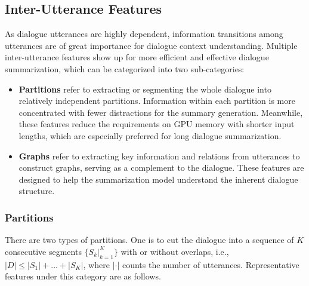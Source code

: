 
\subsection{Inter-Utterance Features}\label{sec:interutt}

As dialogue utterances are highly dependent, information transitions among utterances are of great importance for dialogue context understanding. 
Multiple inter-utterance features show up for more efficient and 
effective dialogue summarization, which can be categorized into 
two sub-categories:
\begin{itemize}
	\item \textbf{Partitions} refer to extracting or segmenting the whole dialogue into relatively independent partitions. Information within each partition is more concentrated with fewer distractions for the summary generation. Meanwhile, these features reduce the requirements on GPU memory with shorter input lengths, which are especially preferred for long dialogue summarization.
	\item \textbf{Graphs} refer to extracting key information and relations from utterances to construct graphs, serving as a complement to the dialogue. These features are designed to help the summarization model understand the inherent dialogue structure.
\end{itemize}

\subsubsection{Partitions} 

There are two types of partitions.
One is to cut the dialogue into a sequence of $K$ consecutive segments $\{S_k|_{k=1}^K\}$ with or without overlaps, i.e., $|D|\leq|S_1| + ... + |S_K|$, where $|\cdot|$ counts the number of utterances. Representative features under this category are as follows.

